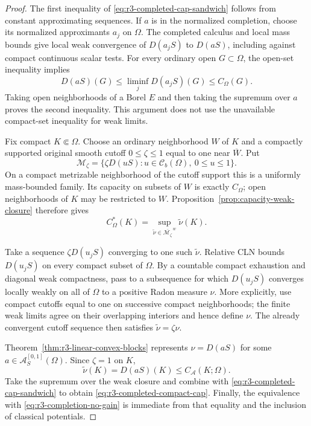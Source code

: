 \documentclass[11pt,a4paper]{article}
\numberwithin{equation}{section}
\theoremstyle{definition}
\theoremstyle{remark}
\newcommand{\Cb}{\mathcal C_b}
\begin{document}
\begin{proof}
The first inequality of \eqref{eq:r3-completed-cap-sandwich}
follows from constant approximating sequences. If $a$ is in
the normalized completion, choose its normalized approximants
$a_j$ on $\Omega$. The completed calculus and local mass bounds
give local weak convergence of $D(a_jS)$ to $D(aS)$, including
against compact continuous scalar tests. For every ordinary
open $G\subset\Omega$, the open-set inequality implies
\[
 D(aS)(G)\leq\liminf_jD(a_jS)(G)\leq C_\Omega(G).
\]
Taking open neighborhoods of a Borel $E$ and then taking the
supremum over $a$ proves the second inequality. This argument
does not use the unavailable compact-set inequality for weak
limits.

Fix compact $K\Subset\Omega$. Choose an ordinary neighborhood
$W$ of $K$ and a compactly supported original smooth cutoff
$0\leq\zeta\leq1$ equal to one near $\overline W$. Put
\[
 \mathcal M_\zeta
    =\{\zeta D(uS):u\in\Cb(\Omega),\ 0\leq u\leq1\}.
\]
On a compact metrizable neighborhood of the cutoff support this
is a uniformly mass-bounded family. Its capacity on subsets of
$W$ is exactly $C_\Omega$; open neighborhoods of $K$ may be
restricted to $W$. Proposition~\ref{prop:capacity-weak-closure}
therefore gives
\[
 C_\Omega^*(K)
       =\sup_{\widetilde\nu\in
                    \overline{\mathcal M_\zeta}^{\,w}}
                    \widetilde\nu(K).
\]

Take a sequence $\zeta D(u_jS)$ converging to one such
$\widetilde\nu$. Relative CLN bounds $D(u_jS)$ on every compact
subset of $\Omega$. By a countable compact exhaustion and
diagonal weak compactness, pass to a subsequence for which
$D(u_jS)$ converges locally weakly on all of $\Omega$ to a
positive Radon measure $\nu$. More explicitly, use compact
cutoffs equal to one on successive compact neighborhoods;
the finite weak limits agree on their overlapping interiors
and hence define $\nu$. The already convergent cutoff sequence
then satisfies $\widetilde\nu=\zeta\nu$.

Theorem~\ref{thm:r3-linear-convex-blocks} represents
$\nu=D(aS)$ for some
$a\in\mathcal A_S^{[0,1]}(\Omega)$. Since $\zeta=1$ on $K$,
\[
 \widetilde\nu(K)=D(aS)(K)\leq C_{\mathcal A}(K;\Omega).
\]
Take the supremum over the weak closure and combine with
\eqref{eq:r3-completed-cap-sandwich} to obtain
\eqref{eq:r3-completed-compact-cap}. Finally, the equivalence
with \eqref{eq:r3-completion-no-gain} is immediate from that
equality and the inclusion of classical potentials.
\end{proof}
\end{document}
